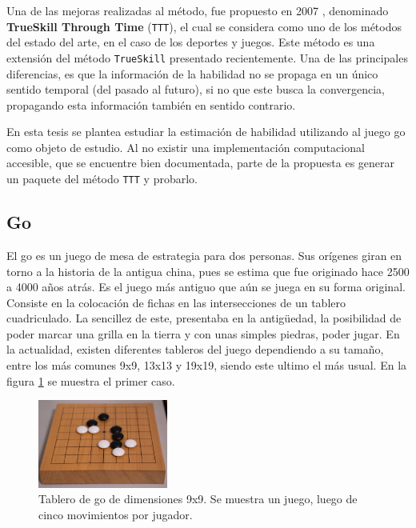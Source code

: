 \documentclass[11pt,twoside, spanish]{report} %
\begin{document}
 Una de las mejoras realizadas al m\'etodo, fue propuesto en 2007 \cite{Dangauthier2007}, denominado \textbf{TrueSkill Through Time} (\texttt{TTT}), el cual se considera como uno de los m\'etodos del estado del arte, en el caso de los deportes y juegos.
 Este m\'etodo es una extensi\'on del m\'etodo \texttt{TrueSkill} presentado recientemente.
 Una de las principales diferencias, es que la informaci\'on de la habilidad no se propaga en un \'unico sentido temporal (del pasado al futuro), si no que este busca la convergencia, propagando esta informaci\'on tambi\'en en sentido contrario. 


\vspace{0.3cm}

\begin{mdframed}[backgroundcolor=frenchblue!20]
	En esta tesis se plantea estudiar la estimaci\'on de habilidad utilizando al juego go como objeto de estudio.
	Al no existir una implementaci\'on computacional accesible, que se encuentre bien documentada, parte de la propuesta es generar un paquete del m\'etodo \texttt{TTT} y probarlo.
\end{mdframed}



\subsection{Go}

El go es un juego de mesa de estrategia para dos personas.
Sus or\'igenes giran en torno a la historia de la antigua china, pues se estima que fue originado hace 2500 a 4000 a\~nos atr\'as.
Es el juego m\'as antiguo que a\'un se juega en su forma original.
Consiste en la colocaci\'on de fichas en las intersecciones de un tablero cuadriculado. %
La sencillez de este, presentaba  en la antig\"uedad, la posibilidad de poder marcar una grilla en la tierra y con unas simples piedras, poder jugar.
En la actualidad, existen diferentes tableros del juego dependiendo a su tama\~no, entre los m\'as comunes 9x9, 13x13 y 19x19, siendo este ultimo el m\'as usual. En la figura \ref{fig:tablero} se muestra el primer caso.

\begin{figure} %
	\includegraphics[width=0.38\textwidth]{../tablero.jpg}
	\caption{Tablero de go de dimensiones 9x9. Se muestra un juego, luego de cinco movimientos por jugador.}
	\label{fig:tablero}
\end{figure}
\end{document}
